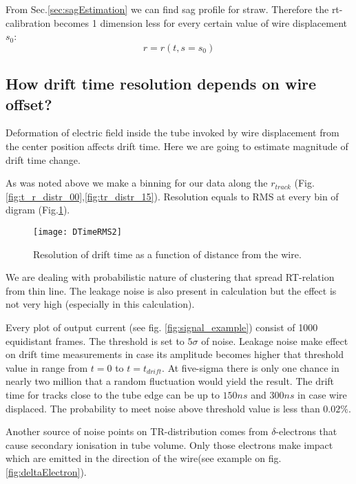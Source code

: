	From Sec.\ref{sec:sagEstimation} we can find sag profile for straw. Therefore the rt-calibration becomes 1 dimension less for every certain value of wire displacement $s_0$:
	\begin{equation}
		r = r(t,s=s_0)
	\end{equation}
	
	
	\subsection{How drift time resolution depends on wire offset?}
	
	Deformation of electric field inside the tube invoked by wire displacement from the center position affects drift time. Here we are going to estimate magnitude of drift time change.
	
	As was noted above we make a binning  for our data along the $r_{track}$ (Fig.\ref{fig:t_r_distr_00},\ref{fig:tr_distr_15}). Resolution equals to RMS at every bin of digram (Fig.\ref{fig:driftTimeResolutionEvo}).
	
	\begin{figure}[h!]
		\centering
		\texttt{[image: DTimeRMS2]}
		\caption{Resolution of drift time as a function of distance from the wire.}
		\label{fig:driftTimeResolutionEvo}
	\end{figure}
	
	We are dealing with probabilistic  nature of clustering that spread RT-relation from thin line. The leakage noise is also present in calculation but the effect is not very high (especially in this calculation).
	
	Every plot of output current (see fig. \ref{fig:signal_example}) consist of 1000 equidistant frames. The threshold is set to $5\sigma$ of noise. Leakage noise make effect on drift time measurements in case its amplitude becomes higher that threshold value in range from $t=0$ to $t= t_{drift}$. At five-sigma there is only one chance in nearly two million that a random fluctuation would yield the result. The drift time for tracks close to the tube edge can be up to $150 ns$ and $300 ns$ in case wire displaced. The probability to meet noise above threshold value is less than $0.02\%$.
	
	Another source of noise points on TR-distribution comes from $\delta$-electrons that cause secondary ionisation in tube volume. Only those electrons make impact which are emitted in the direction of the wire(see example on fig.\ref{fig:deltaElectron}).
	
